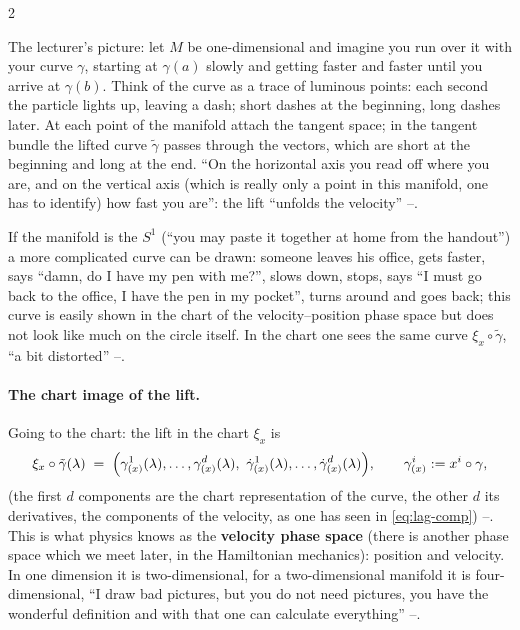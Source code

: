 \begin{paracol}{2}
\begin{example}\label{ex:lag-liftex}
The lecturer's picture: let $M$ be one-dimensional and imagine you run over it with your curve $\gamma$, starting at $\gamma(a)$ slowly and getting faster and faster until you arrive at $\gamma(b)$. Think of the curve as a trace of luminous points: each second the particle lights up, leaving a dash; short dashes at the beginning, long dashes later. At each point of the manifold attach the tangent space; in the tangent bundle the lifted curve $\tilde\gamma$ passes through the vectors, which are short at the beginning and long at the end.
``On the horizontal axis you read off where you are, and on the vertical axis (which is really only a point in this manifold, one has to identify) how fast you are'': the lift ``unfolds the velocity'' --.
\end{example}
\begin{aside}\label{as:lag-office}
If the manifold is the $S^1$ (``you may paste it together at home from the handout'') a more complicated curve can be drawn: someone leaves his office, gets faster, says ``damn, do I have my pen with me?'', slows down, stops, says ``I must go back to the office, I have the pen in my pocket'', turns around and goes back; this curve is easily shown in the chart of the velocity--position phase space but does not look like much on the circle itself. In the chart one sees the same curve $\xi_x\circ\tilde\gamma$, ``a bit distorted'' --.
\end{aside}

\paragraph{The chart image of the lift.} Going to the chart: the lift in the chart $\xi_x$ is
\begin{equation}\label{eq:lag-liftchart}
  \xi_x\circ\tilde\gamma(\lambda)\;=\;\Bigl(\gamma^1_{(x)}(\lambda),\dots,\gamma^d_{(x)}(\lambda),\ \dot\gamma^1_{(x)}(\lambda),\dots,\dot\gamma^d_{(x)}(\lambda)\Bigr),\qquad \gamma^i_{(x)}:=x^i\circ\gamma ,
\end{equation}
(the first $d$ components are the chart representation of the curve, the other $d$ its derivatives, the components of the velocity, as one has seen in \cref{eq:lag-comp}) --. This is what physics knows as the \textbf{velocity phase space} (there is another phase space which we meet later, in the Hamiltonian mechanics): position and velocity. In one dimension it is two-dimensional, for a two-dimensional manifold it is four-dimensional, ``I draw bad pictures, but you do not need pictures, you have the wonderful definition and with that one can calculate everything'' --.


\end{paracol}
